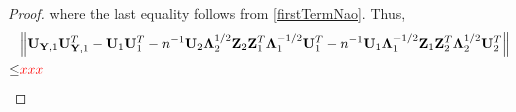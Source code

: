 \documentclass[12pt]{article} %
\DeclareMathOperator{\mytr}{tr}
\newcommand{\bZ}{\mathbf{Z}}
\newcommand{\bY}{\mathbf{Y}}
\newcommand{\bI}{\mathbf{I}}
\newcommand{\bU}{\mathbf{U}}
\newcommand{\bfsym}[1]{\ensuremath{\boldsymbol{#1}}}
\def\blambda {\bfsym {\lambda}}
\def\bLambda {\bfsym {\Lambda}}
\theoremstyle{definition}
\begin{document}
\begin{appendices}
\begin{proof}
    where the last equality follows from \eqref{firstTermNao}.
    Thus,
    \begin{equation*}
        \begin{split}
            &\Big\|
         \bU_{\bY,1}\bU_{\bY,1}^T
         -\bU_1\bU_1^T
-
n^{-1}\bU_2 \bLambda_2^{1/2} \bZ_2 \bZ_1^T \bLambda_1^{-1/2} \bU_1^T
-
    n^{-1}\bU_1  \bLambda_1^{-1/2} \bZ_1 \bZ_2^T \bLambda_2^{1/2} \bU_2^T
            \Big\|
            \\
            \leq &
            {\color{red}xxx}
        \end{split}
    \end{equation*}


\end{proof}
\end{appendices}
\end{document}
